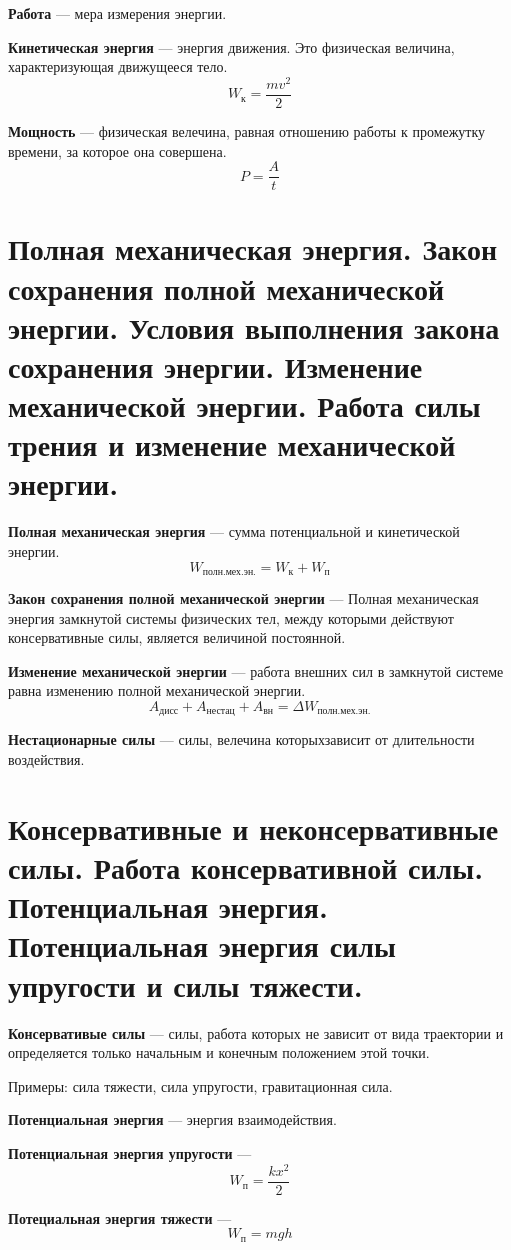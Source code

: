 \documentclass{report}
\begin{document}
{\bf Работа} ---
мера измерения энергии.

{\bf Кинетическая энергия} ---
энергия движения. Это физическая величина, характеризующая движущееся тело.
$$
W_\textrm{к}=\frac{mv^2}{2}
$$

{\bf Мощность} ---
физическая велечина, равная отношению работы к промежутку времени, за которое она совершена.
$$
P=\frac{A}{t}
$$



\part{Полная механическая энергия. 
Закон сохранения полной механической энергии. 
Условия выполнения закона сохранения энергии. 
Изменение механической энергии. 
Работа силы трения и изменение механической энергии.}

{\bf Полная механическая энергия} ---
сумма потенциальной и кинетической энергии.
$$
W_\textrm{полн.мех.эн.}=W_\textrm{к}+W_\textrm{п}
$$

{\bf Закон сохранения полной механической энергии} ---
Полная механическая энергия замкнутой системы физических тел, 
между которыми действуют консервативные силы, является величиной постоянной.

{\bf Изменение механической энергии} ---
работа внешних сил в замкнутой системе равна изменению полной механической энергии.
$$
A_\textrm{дисс}+A_\textrm{нестац}+A_\textrm{вн}=\Delta W_\textrm{полн.мех.эн.}
$$

{\bf Нестационарные силы} ---
силы, велечина которыхзависит от длительности воздействия.

\part{Консервативные и неконсервативные силы. 
Работа консервативной силы. 
Потенциальная энергия. 
Потенциальная энергия силы упругости и силы тяжести.}

{\bf Консервативые силы} ---
силы, работа которых не зависит от вида траектории и определяется только 
начальным и конечным положением этой точки.

Примеры: сила тяжести, сила упругости, гравитационная сила.

{\bf Потенциальная энергия} ---
энергия взаимодействия.

{\bf Потенциальная энергия упругости} ---
$$
W_\textrm{п}=\frac{kx^2}{2}
$$

{\bf Потециальная энергия тяжести} ---
$$
W_\textrm{п}=mgh
$$
\end{document}
